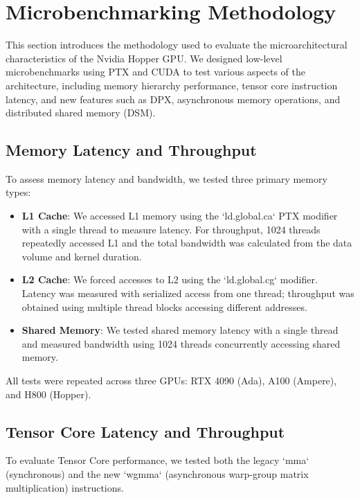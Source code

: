 \section{Microbenchmarking Methodology}

This section introduces the methodology used to evaluate the microarchitectural characteristics of the Nvidia Hopper GPU. We designed low-level microbenchmarks using PTX and CUDA\cite{jia2018dissecting} to test various aspects of the architecture, including memory hierarchy performance, tensor core instruction latency, and new features such as DPX, asynchronous memory operations, and distributed shared memory (DSM).

\subsection{Memory Latency and Throughput}

To assess memory latency and bandwidth, we tested three primary memory types:

\begin{itemize}
    \item \textbf{L1 Cache}: We accessed L1 memory using the `ld.global.ca` PTX modifier with a single thread to measure latency. For throughput, 1024 threads repeatedly accessed L1 and the total bandwidth was calculated from the data volume and kernel duration.
    \item \textbf{L2 Cache}: We forced accesses to L2 using the `ld.global.cg` modifier. Latency was measured with serialized access from one thread; throughput was obtained using multiple thread blocks accessing different addresses.
    \item \textbf{Shared Memory}: We tested shared memory latency with a single thread and measured bandwidth using 1024 threads concurrently accessing shared memory.
\end{itemize}

All tests were repeated across three GPUs: RTX 4090 (Ada), A100 (Ampere), and H800 (Hopper).

\subsection{Tensor Core Latency and Throughput}

To evaluate Tensor Core performance, we tested both the legacy `mma` (synchronous) and the new `wgmma` (asynchronous warp-group matrix multiplication) instructions.

